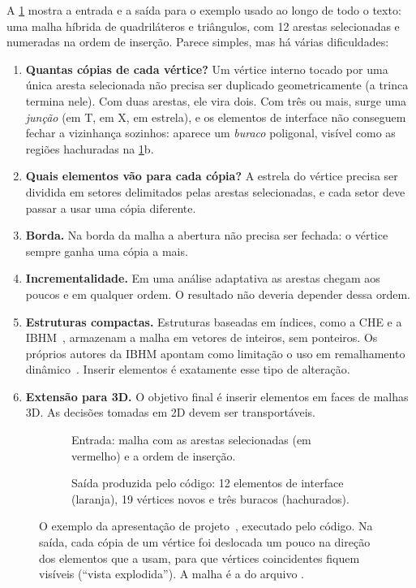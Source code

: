 A \cref{fig:exemplo-intro} mostra a entrada e a saída para o exemplo usado ao longo de todo o texto: uma malha híbrida
de quadriláteros e triângulos, com 12 arestas selecionadas e numeradas na ordem de inserção. Parece simples, mas há
várias dificuldades:
\begin{enumerate}
\item \textbf{Quantas cópias de cada vértice?} Um vértice interno tocado por uma única aresta selecionada não precisa
ser duplicado geometricamente (a trinca termina nele). Com duas arestas, ele vira dois. Com três ou mais, surge uma
\emph{junção} (em T, em X, em estrela), e os elementos de interface não conseguem fechar a vizinhança sozinhos:
aparece um \emph{buraco} poligonal, visível como as regiões hachuradas na \cref{fig:exemplo-intro}b.
\item \textbf{Quais elementos vão para cada cópia?} A estrela do vértice precisa ser dividida em setores delimitados
pelas arestas selecionadas, e cada setor deve passar a usar uma cópia diferente.
\item \textbf{Borda.} Na borda da malha a abertura não precisa ser fechada: o vértice sempre ganha uma cópia a mais.
\item \textbf{Incrementalidade.} Em uma análise adaptativa as arestas chegam aos poucos e em qualquer ordem. O
resultado não deveria depender dessa ordem.
\item \textbf{Estruturas compactas.} Estruturas baseadas em índices, como a CHE e a IBHM~\cite{che,ibhm}, armazenam a
malha em vetores de inteiros, sem ponteiros. Os próprios autores da IBHM apontam como limitação o uso em remalhamento
dinâmico~\cite{ibhm}. Inserir elementos é exatamente esse tipo de alteração.
\item \textbf{Extensão para 3D.} O objetivo final é inserir elementos em faces de malhas 3D. As decisões tomadas em 2D
devem ser transportáveis.
\end{enumerate}

\begin{figure}[ht]
\centering
\begin{subfigure}[b]{0.42\linewidth}\centering
  
  \caption{Entrada: malha com as arestas selecionadas (em vermelho) e a ordem de inserção.}
\end{subfigure}\hfill
\begin{subfigure}[b]{0.55\linewidth}\centering
  
  \caption{Saída produzida pelo código: 12 elementos de interface (laranja), 19 vértices novos e três buracos
  (hachurados).}
\end{subfigure}
\caption{O exemplo da apresentação de projeto~\cite{slides}, executado pelo código. Na saída, cada cópia de um vértice
foi deslocada um pouco na direção dos elementos que a usam, para que vértices coincidentes fiquem visíveis (``vista
explodida''). A malha é a do arquivo .}
\label{fig:exemplo-intro}
\end{figure}

